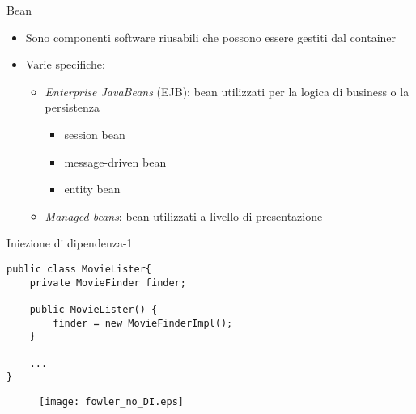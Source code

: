 \begin{frame}{Bean}

\begin{itemize}
\item Sono componenti software riusabili che possono essere gestiti dal container

\vspace{1em}

\item Varie specifiche:
	\begin{itemize}
	
	\vspace{0.8em}
	
	\item \textsl{Enterprise JavaBeans} (EJB): bean utilizzati per la logica di business o la persistenza
		\begin{itemize}
		
		\vspace{0.5em}
		
		\item session bean
		
		\vspace{0.3em}
		
		\item message-driven bean
		
		\vspace{0.3em}
		
		\item entity bean
		\end{itemize}
	
	\vspace{0.8em}
	
	\item  \textsl{Managed beans}: bean utilizzati a livello di presentazione
	\end{itemize}

\end{itemize}

\end{frame}





\begin{frame}[fragile]{Iniezione di dipendenza-1}


\begin{lstlisting}[basicstyle={\tiny\ttfamily}]
public class MovieLister{
    private MovieFinder finder;
    
    public MovieLister() {
        finder = new MovieFinderImpl();
    }
    
    ...
}
\end{lstlisting}


\begin{figure}
	\centering
	\texttt{[image: fowler\_no\_DI.eps]}
\end{figure}



\end{frame}



